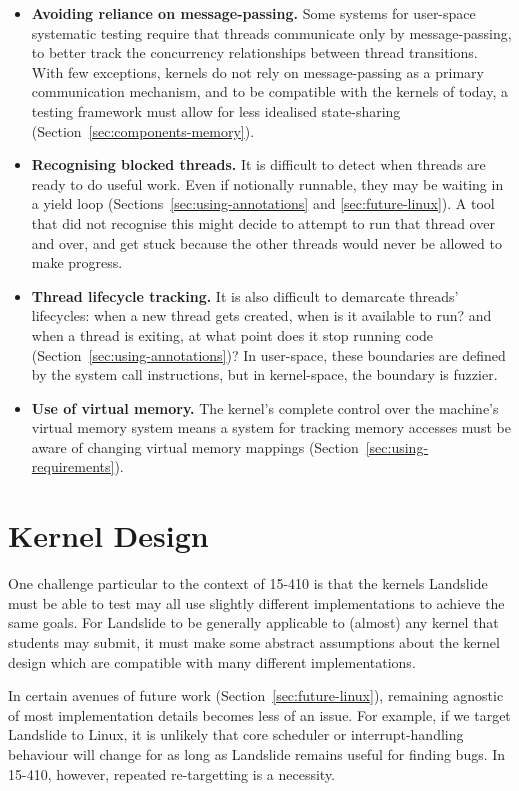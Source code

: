 \begin{itemize}
	\item {\bf Avoiding reliance on message-passing.} Some systems for user-space systematic testing require that threads communicate only by message-passing, to better track the concurrency relationships between thread transitions\cite{dbug-ssv}. With few exceptions\cite{barrelfish}, kernels do not rely on message-passing as a primary communication mechanism, and to be compatible with the kernels of today, a testing framework must allow for less idealised state-sharing (Section~\ref{sec:components-memory}).
	\item {\bf Recognising blocked threads.} It is difficult to detect when threads are ready to do useful work. Even if notionally runnable, they may be waiting in a yield loop (Sections~\ref{sec:using-annotations} and \ref{sec:future-linux}). A tool that did not recognise this might decide to attempt to run that thread over and over, and get stuck because the other threads would never be allowed to make progress.
	\item {\bf Thread lifecycle tracking.} It is also difficult to demarcate threads' lifecycles: when a new thread gets created, when is it available to run? and when a thread is exiting, at what point does it stop running code (Section~\ref{sec:using-annotations})? In user-space, these boundaries are defined by the system call instructions, but in kernel-space, the boundary is fuzzier.
	\item {\bf Use of virtual memory.} The kernel's complete control over the machine's virtual memory system means a system for tracking memory accesses must be aware of changing virtual memory mappings (Section~\ref{sec:using-requirements}).
\end{itemize}

\section{Kernel Design}
\label{sec:challenges-design}

One challenge particular to the context of 15-410 is that the kernels Landslide must be able to test may all use slightly different implementations to achieve the same goals. For Landslide to be generally applicable to (almost) any kernel that students may submit, it must make some abstract assumptions about the kernel design which are compatible with many different implementations.

In certain avenues of future work (Section~\ref{sec:future-linux}), remaining agnostic of most implementation details becomes less of an issue. For example, if we target Landslide to Linux, it is unlikely that core scheduler or interrupt-handling behaviour will change for as long as Landslide remains useful for finding bugs. In 15-410, however, repeated re-targetting is a necessity.

